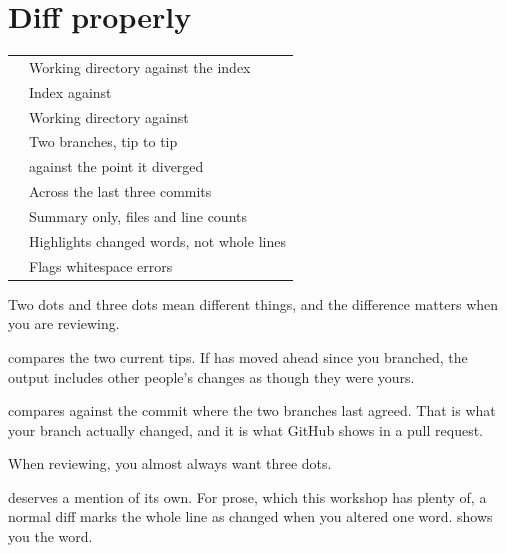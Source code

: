 \documentclass[11pt]{article}
\begin{document}
\section{Diff properly}

\vspace{0.5em}
\begin{tabularx}{\linewidth}{@{}L{6.4cm} X@{}}
\toprule
{} &  \\
\midrule
{} & Working directory against the index \\
 & Index against  \\
 & Working directory against  \\
 & Two branches, tip to tip \\
 &  against the point it diverged \\
 & Across the last three commits \\
 & Summary only, files and line counts \\
 & Highlights changed words, not whole lines \\
 & Flags whitespace errors \\
\bottomrule
\end{tabularx}
\vspace{0.5em}

\begin{trap}
Two dots and three dots mean different things, and the difference matters when you
are reviewing.

 compares the two current tips. If  has moved
ahead since you branched, the output includes other people's changes as though they
were yours.

 compares  against the commit where the two
branches last agreed. That is what your branch actually changed, and it is what
GitHub shows in a pull request.

When reviewing, you almost always want three dots.
\end{trap}

 deserves a mention of its own. For prose, which this workshop has
plenty of, a normal diff marks the whole line as changed when you altered one word.
 shows you the word.
\end{document}
